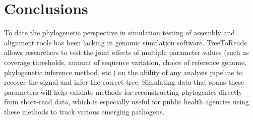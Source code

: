 \section{Conclusions}
To date the phylogenetic perspective in simulation testing of assembly and alignment tools has been lacking in genomic simulation software. 
TreeToReads allows researchers to test the joint effects of multiple parameter values (such as coverage thresholds, 
amount of sequence variation, choice of reference genome, phylogenetic inference method, etc.) on the ability of any analysis pipeline to recover the signal and infer the correct tree. 
Simulating data that spans these parameters will help validate methods for reconstructing phylogenies directly from short-read data, 
which is especially useful for public health agencies using these methods to track various emerging pathogens. 




